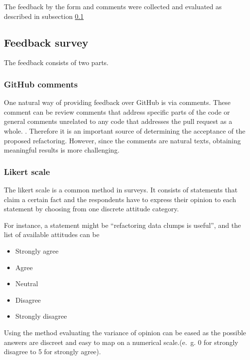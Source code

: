 The feedback by the form and comments were collected and evaluated as described in subsection \ref{sec:feedback_survey}

\subsection{Feedback survey}\label{sec:feedback_survey}

The feedback consists of two parts.
\subsubsection{GitHub comments}
One  natural way of providing feedback over GitHub is via comments. These comment can be review comments that address specific parts of the code or general comments unrelated to any code that addresses the pull request as a whole. \cite{10.1145/3597208}. Therefore it is an important source of determining the acceptance of the proposed refactoring. However, since the comments are natural texts, obtaining meaningful results is more challenging. 

\subsubsection{Likert scale}
The likert scale is a common method in surveys. It consists of statements that claim a certain fact and the respondents have to express their opinion to each statement by choosing from one discrete attitude category. \cite{edmondson2005likert}

For instance, a statement might be \enquote{refactoring data clumps is useful}, and the list of available attitudes can be
\begin{itemize}
    \item Strongly agree
    \item Agree
    \item Neutral
    \item Disagree
    \item Strongly disagree
\end{itemize}

Using the method evaluating the variance of opinion can be eased as the possible answers are discreet and easy to map on a numerical scale.(e.~g. 0 for strongly disagree to 5 for strongly agree).


